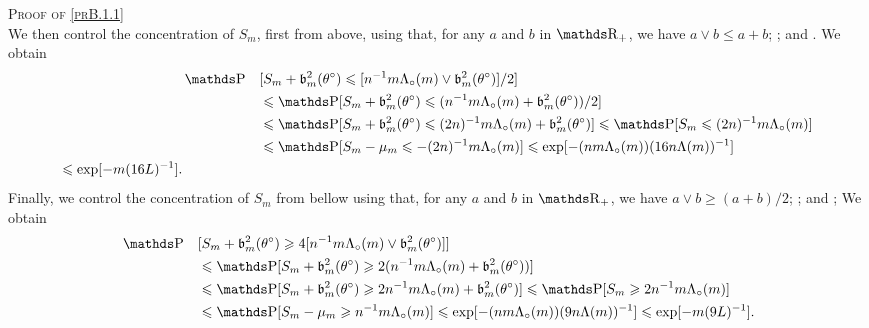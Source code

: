 \begin{pro}{\textsc{Proof of \textsc{\cref{prB.1.1}}} \\}
We then control the concentration of $S_{m}$, first from above, using that, for any $a$ and $b$ in $\R_{+}$, we have $a \vee b \leq a+b$; ; and .
We obtain
\begin{alignat*}{2}
& \P&&[S_{m} + \mathfrak{b}_{m}^{2}(\theta^{\circ}) \leq [n^{-1} m \Lambda_{\circ}(m) \vee \mathfrak{b}_{m}^{2}(\theta^{\circ})]/2 ]\\
& && \leq \P[S_{m} + \mathfrak{b}_{m}^{2}(\theta^{\circ}) \leq (n^{-1}m \Lambda_{\circ}(m) + \mathfrak{b}_{m}^{2}(\theta^{\circ}))/2 ]\\
& && \leq \P[S_{m} + \mathfrak{b}_{m}^{2}(\theta^{\circ}) \leq (2n)^{-1} m \Lambda_{\circ}(m) + \mathfrak{b}_{m}^{2}(\theta^{\circ}) ] \leq \P[S_{m} \leq (2n)^{-1} m \Lambda_{\circ}(m) ] \\
& &&\leq \P[S_{m} - \mu_{m} \leq - (2n)^{-1} m \Lambda_{\circ}(m)] \leq \exp[- (n m \Lambda_{\circ}(m))(16 n \Lambda(m))^{-1}]\\
\leq \exp[- m(16 L)^{-1}].
\end{alignat*}
Finally, we control the concentration of $S_{m}$ from bellow using that, for any $a$ and $b$ in $\R_{+}$, we have $a \vee b \geq (a+b)/2$; ; and ;
We obtain
\begin{alignat*}{2}
& \P &&[S_{m} + \mathfrak{b}_{m}^{2}(\theta^{\circ}) \geq 4 [n^{-1} m \Lambda_{\circ}(m) \vee \mathfrak{b}_{m}^{2}(\theta^{\circ})] ]\\
& && \leq \P[S_{m} + \mathfrak{b}_{m}^{2}(\theta^{\circ}) \geq 2 (n^{-1} m \Lambda_{\circ}(m) + \mathfrak{b}_{m}^{2}(\theta^{\circ})) ]\\
& && \leq \P[S_{m} + \mathfrak{b}_{m}^{2}(\theta^{\circ}) \geq 2 n^{-1} m \Lambda_{\circ}(m) + \mathfrak{b}_{m}^{2}(\theta^{\circ}) ] \leq \P[S_{m} \geq 2 n^{-1} m \Lambda_{\circ}(m)]\\
& && \leq \P[S_{m} - \mu_{m} \geq n^{-1} m \Lambda_{\circ}(m)] \leq \exp[- (n m \Lambda_{\circ}(m))(9 n \Lambda(m))^{-1}] \leq \exp[- m(9 L)^{-1}].
\end{alignat*}
\proEnd
\end{pro}


